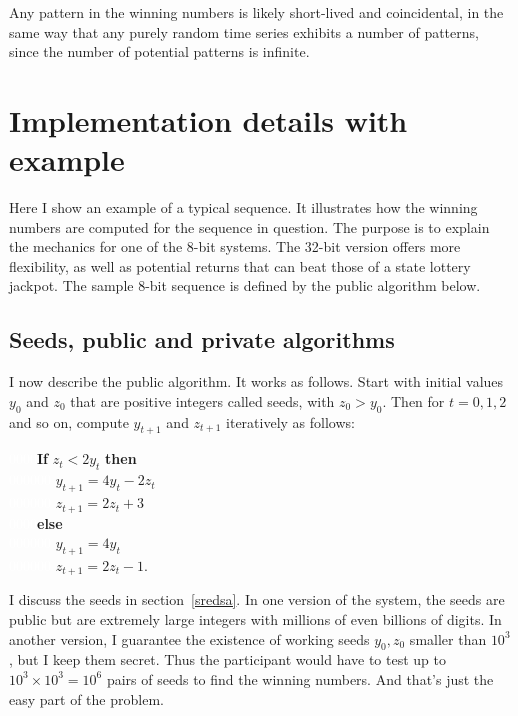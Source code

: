 \documentclass[oneside,10pt]{book}
\begin{document}
\noindent Any pattern in the winning numbers is likely short-lived and coincidental, in the same way that any purely random
 time series exhibits a number of patterns, since the number of potential patterns is infinite.

\section{Implementation details with example}

Here I show an example of a typical sequence. It illustrates how the winning numbers are computed for the sequence in question. The purpose is to explain the mechanics for one of the 8-bit systems. The 32-bit version offers more flexibility, as well as potential returns that can beat those of a state lottery jackpot. The sample 8-bit sequence is defined by the public algorithm below.


\subsection{Seeds, public and private algorithms}\label{porcinired}

I now describe the public algorithm. It works as follows. Start with initial values $y_0$ and $z_0$ that are positive integers
called \textcolor{index}{seeds}, with $z_0>y_0$. Then for $t = 0, 1, 2$ and so on, compute $y_{t+1}$ and $z_{t+1}$ iteratively as follows:\vspace{1ex}

\noindent  \textcolor{white}{0000}{\bf If}  $ z_t  <2y_t$   {\bf then}   \\
  \textcolor{white}{000000}  $y_{t+1}=4y_t-2z_t$\\
 \textcolor{white}{000000} $z_{t+1}=2z_t+3$\\
\textcolor{white}{0000}{\bf else} \\
\textcolor{white}{000000} $ y_{t+1}=4y_t$\\
\textcolor{white}{000000} $ z_{t+1}=2z_t-1.$
\vspace{1ex}

\noindent I discuss the seeds in section~\ref{sredsa}. In one version of the system, the seeds are public but are extremely large integers with millions of even billions of digits. In another version, I guarantee the existence of working seeds $y_0, z_0$ smaller than $10^3$, but I keep them secret. Thus the participant would have to test up to $10^3 \times 10^3 = 10^6$ pairs of seeds to find the winning numbers. And that's just the easy part of the problem.
\end{document}
